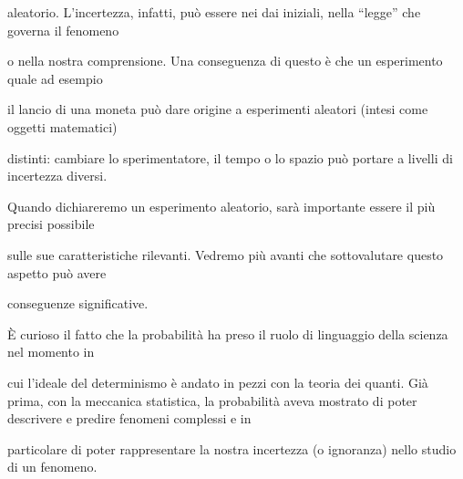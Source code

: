 \documentclass[a4paper,portrait,12pt]{article}
\begin{document}
\begin{flushleft}
aleatorio. L'incertezza, infatti, pu\`{o} essere nei dai iniziali, nella {``}legge'' che governa il fenomeno
\end{flushleft}


\begin{flushleft}
o nella nostra comprensione. Una conseguenza di questo \`{e} che un esperimento quale ad esempio
\end{flushleft}


\begin{flushleft}
il lancio di una moneta pu\`{o} dare origine a esperimenti aleatori (intesi come oggetti matematici)
\end{flushleft}


\begin{flushleft}
distinti: cambiare lo sperimentatore, il tempo o lo spazio pu\`{o} portare a livelli di incertezza diversi.
\end{flushleft}


\begin{flushleft}
Quando dichiareremo un esperimento aleatorio, sar\`{a} importante essere il più precisi possibile
\end{flushleft}


\begin{flushleft}
sulle sue caratteristiche rilevanti. Vedremo più avanti che sottovalutare questo aspetto pu\`{o} avere
\end{flushleft}


\begin{flushleft}
conseguenze significative.
\end{flushleft}


\begin{flushleft}
\`{E} curioso il fatto che la probabilit\`{a} ha preso il ruolo di linguaggio della scienza nel momento in
\end{flushleft}


\begin{flushleft}
cui l'ideale del determinismo \`{e} andato in pezzi con la teoria dei quanti. Gi\`{a} prima, con la meccanica statistica, la probabilit\`{a} aveva mostrato di poter descrivere e predire fenomeni complessi e in
\end{flushleft}


\begin{flushleft}
particolare di poter rappresentare la nostra incertezza (o ignoranza) nello studio di un fenomeno.
\end{flushleft}
\end{document}
